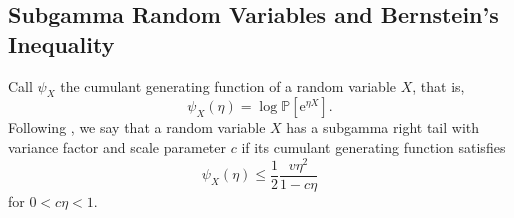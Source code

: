 \documentclass{uvamath}
\newcommand*{\bbP}{\mathbb{P}}
\newcommand*{\prob}[2][]{\mathbb{P}_{#1}\left\{#2\right\}}
\newcommand*{\bracks}[1]{\left\{#1\right\}}
\newcommand*{\paren}[1]{\left(#1\right)}
\newcommand*{\evat}[2]{\left.#1\right|_{#2}}
\newcommand*{\rme}{\mathrm{e}}
\newcommand*{\rmd}{\mathrm{d}}
\theoremstyle{remark}
\theoremstyle{definition}
\theoremstyle{definition}
\theoremstyle{definition}
\theoremstyle{definition}
\theoremstyle{definition}
\begin{document}
\begin{appendices}




\chapter{Subgamma Random Variables and Bernstein's
  Inequality\label{sect:bernstein_inequality}}

Call $\psi_X$ the cumulant generating function of a random variable
$X$, that is,
\begin{equation*}
  \psi_X(\eta) = \log \bbP[ \rme^{\eta X}].
\end{equation*}
Following \cite{boucheron_concentration_2013}, we say that a random
variable $X$ has a subgamma right tail with variance factor and scale
parameter $c$ if its cumulant generating function satisfies
\begin{equation}\label{eq:def_subgamma_tail}
  \psi_{X}(\eta) \leq \frac{1}{2}\frac{v\eta^2}{1-c\eta}
\end{equation}
for $0<c\eta<1$.


\end{appendices}
\end{document}
